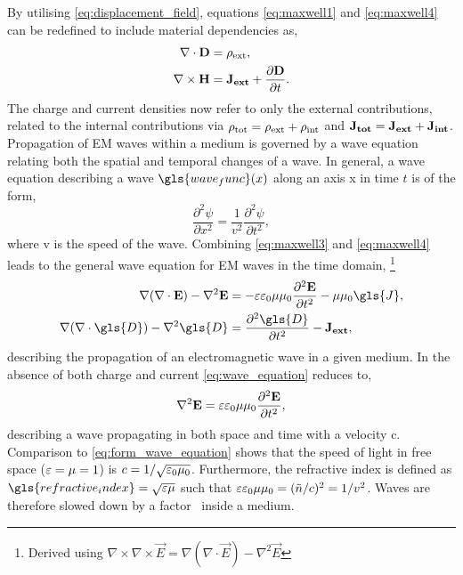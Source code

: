 \documentclass{article}
\begin{document}
By utilising \eqref{eq:displacement_field}, equations \eqref{eq:maxwell1} and \eqref{eq:maxwell4} can be redefined to include material dependencies as,
\begin{subequations}
\begin{align}
	\nabla \cdot \mathbf{D} &= \rho_{\mathrm{ext}}, \label{eq:new_maxwell1}\\
	\nabla \times \mathbf{H} &= \mathbf{J_{ext}} + \frac{\partial \mathbf{D}}{\partial t}. \label{eq:new_maxwell4}
\end{align}
\end{subequations}
The charge and current densities now refer to only the external contributions, related to the internal contributions via $\rho_{\mathrm{tot}}=\rho_{\mathrm{ext}}+\rho_{\mathrm{int}}$ and $\mathbf{J_{tot}}=\mathbf{J_{ext}}+\mathbf{J_{int}}$.
Propagation of EM waves within a medium is governed by a wave equation relating both the spatial and temporal changes of a wave. In general, a wave equation describing a wave $\gls{wave_func}(x)$ along an axis \gls{x} in time $t$ is of the form,
\begin{equation}
	\frac{\partial^2 \psi}{\partial x^2} = \frac{1}{v^2} \frac{\partial^2 \psi}{\partial t^2},
	\label{eq:form_wave_equation}
\end{equation}
where \gls{v} is the speed of the wave. Combining \eqref{eq:maxwell3} and \eqref{eq:maxwell4} leads to the general wave equation for EM waves in the time domain,%
\footnote{Derived using $\nabla \times \nabla \times \vec{E} = \nabla(\nabla\cdot\vec{E}) - \nabla^2\vec{E}$}%
\begin{align}
	\nabla(\nabla\cdot\vec{E}) - \nabla^2\vec{E} &= -\eps\epsfs\mu\mu_0\frac{\partial^2\vec{E}}{\partial t^2} - \mu\mu_0\gls{J}, \\
	\nabla(\nabla\cdot\gls{D}) - \nabla^2\gls{D} &= \frac{\partial^2\gls{D}}{\partial t^2} - \Jext,
	\label{eq:wave_equation}
\end{align}
describing the propagation of an electromagnetic wave in a given medium.
In the absence of both charge and current \eqref{eq:wave_equation} reduces to,
\begin{equation}
	\nabla^2\mathbf{E} = \varepsilon\varepsilon_0\mu\mu_0\frac{\partial^2\mathbf{E}}{\partial t^2},
\end{equation}
describing a wave propagating in both space and time with a velocity \gls{c}. Comparison to \eqref{eq:form_wave_equation} shows that the speed of light in free space ($\varepsilon=\mu=1$) is $c=1/\sqrt{\varepsilon_0\mu_0}$. Furthermore, the refractive index is defined as $\gls{refractive_index}=\sqrt{\eps\mu}$ such that $\varepsilon\varepsilon_0\mu\mu_0 = (\tilde{n}/c)^2 = 1/v^2$. Waves are therefore slowed down by a factor \ inside a medium.
\end{document}
